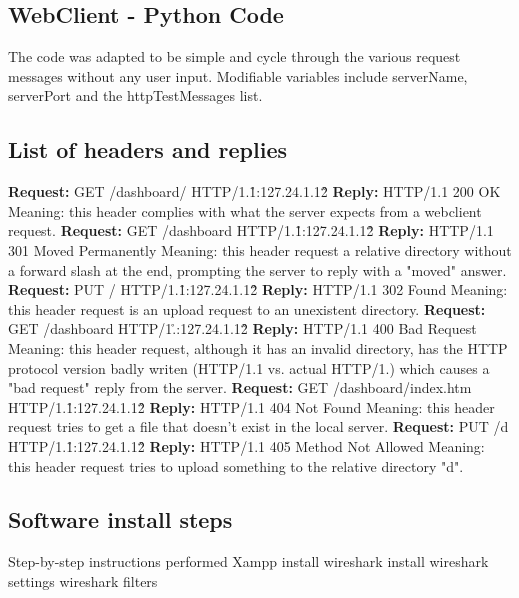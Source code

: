 \documentclass[11pt,a4paper]{report}
\begin{document}
    \subsection{WebClient - Python Code}
        \lstset{style=pythoncode}
        
        The code was adapted to be simple and cycle through the various request messages without any user input.
        Modifiable variables include serverName, serverPort and the httpTestMessages list.
    
    \subsection{List of headers and replies}
            \textbf{Request:} GET /dashboard/ HTTP/1.1\r\nHost:127.24.1.12\r\n\r\n
            \textbf{Reply:} HTTP/1.1 200 OK
                Meaning: this header complies with what the server expects from a webclient request.
            \textbf{Request:} GET /dashboard HTTP/1.1\r\nHost:127.24.1.12\r\n\r\n
            \textbf{Reply:} HTTP/1.1 301 Moved Permanently
                Meaning: this header request a relative directory without a forward slash at the end, prompting the server to reply with a "moved" answer.
            \textbf{Request:} PUT / HTTP/1.1\r\nHost:127.24.1.12\r\n\r\n
            \textbf{Reply:} HTTP/1.1 302 Found
                Meaning: this header request is an upload request to an unexistent directory.
            \textbf{Request:} GET /dashboard HTTP/1.\r\nHost:127.24.1.12\r\n\r\n
            \textbf{Reply:} HTTP/1.1 400 Bad Request
                Meaning: this header request, although it has an invalid directory, has the HTTP protocol version badly writen (HTTP/1.1 vs. actual HTTP/1.) which causes
                a "bad request" reply from the server.
            \textbf{Request:} GET /dashboard/index.htm HTTP/1.1\r\nHost:127.24.1.12\r\n\r\n
            \textbf{Reply:} HTTP/1.1 404 Not Found
                Meaning: this header request tries to get a file that doesn't exist in the local server.
            \textbf{Request:} PUT /d HTTP/1.1\r\nHost:127.24.1.12\r\n\r\n
            \textbf{Reply:} HTTP/1.1 405 Method Not Allowed
                Meaning: this header request tries to upload something to the relative directory "d".
        
    \subsection{Software install steps}
        Step-by-step instructions performed
        Xampp install
        wireshark install
        wireshark settings
        wireshark filters
\end{document}
